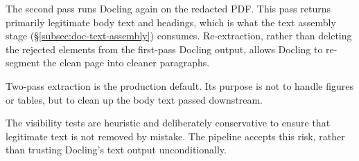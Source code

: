 The second pass runs Docling again on the redacted PDF. This pass returns primarily legitimate body text and headings, which is what the text assembly stage (§\ref{subsec:doc-text-assembly}) consumes. Re-extraction, rather than deleting the rejected elements from the first-pass Docling output, allows Docling to re-segment the clean page into cleaner paragraphs. 

Two-pass extraction is the production default. Its purpose is not to handle figures or tables, but to clean up the body text passed downstream. 

The visibility tests are heuristic and deliberately conservative to ensure that legitimate text is not removed by mistake. The pipeline accepts this risk, rather than trusting Docling's text output unconditionally. 